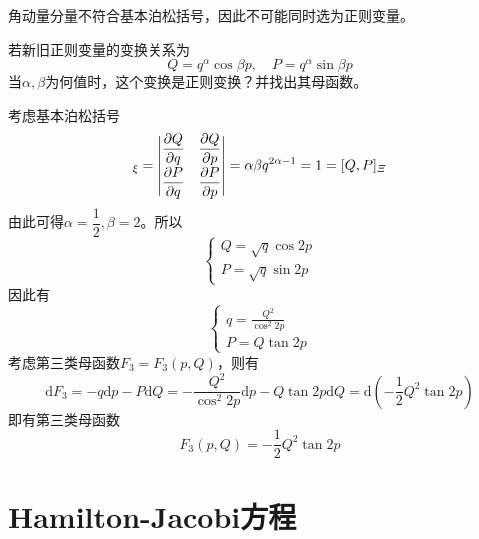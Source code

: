 角动量分量不符合基本泊松括号，因此不可能同时选为正则变量。

\begin{example}
若新旧正则变量的变换关系为
\begin{equation*}
	Q = q^\alpha \cos \beta p,\quad P = q^\alpha \sin \beta p
\end{equation*}
当$\alpha,\beta$为何值时，这个变换是正则变换？并找出其母函数。
\end{example}
\begin{solution}
考虑基本泊松括号
\begin{equation*}
	[Q,P]_\xi = \begin{vmatrix} \dfrac{\pl Q}{\pl q} & \dfrac{\pl Q}{\pl p} \\[1.5ex] \dfrac{\pl P}{\pl q} & \dfrac{\pl P}{\pl p} \end{vmatrix} = \alpha \beta q^{2\alpha-1} = 1 = [Q,P]_{\mathnormal{\Xi}}
\end{equation*}
由此可得$\alpha=\dfrac12,\beta = 2$。所以
\begin{equation*}
	\begin{cases}
		\displaystyle Q = \sqrt{q} \cos 2p \\
		\displaystyle P = \sqrt{q} \sin 2p
	\end{cases}
\end{equation*}
因此有
\begin{equation*}
	\begin{cases}
		\displaystyle q = \frac{Q^2}{\cos^2 2p} \\
		\displaystyle P = Q\tan 2p
	\end{cases}
\end{equation*}
考虑第三类母函数$F_3 = F_3(p,Q)$，则有
\begin{equation*}
	\mathrm{d} F_3 = -q\mathrm{d} p - P\mathrm{d} Q = -\frac{Q^2}{\cos^2 2p} \mathrm{d} p - Q\tan 2p \mathrm{d}Q = \mathrm{d} \left(-\frac12 Q^2 \tan 2p\right)
\end{equation*}
即有第三类母函数
\begin{equation*}
	F_3(p,Q) = -\frac12 Q^2 \tan 2p
\end{equation*}
\end{solution}

\section{Hamilton-Jacobi方程}

